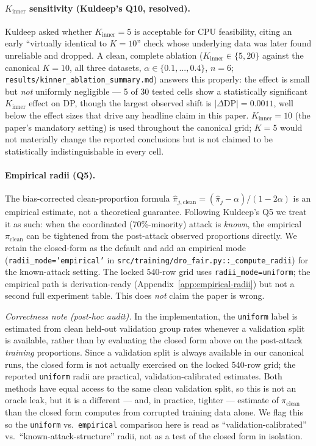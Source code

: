\paragraph{$K_{\mathrm{inner}}$ sensitivity (Kuldeep's Q10, resolved).}
Kuldeep asked whether $K_{\mathrm{inner}}{=}5$ is acceptable for CPU
feasibility, citing an early ``virtually identical to $K{=}10$'' check
whose underlying data was later found unreliable and dropped. A clean,
complete ablation ($K_{\mathrm{inner}}\in\{5,20\}$ against the canonical
$K{=}10$, all three datasets, $\alpha\in\{0.1,...,0.4\}$, $n{=}6$;
\texttt{results/kinner\_ablation\_summary.md}) answers this properly:
the effect is small but \emph{not} uniformly negligible --- 5 of 30
tested cells show a statistically significant $K_{\mathrm{inner}}$
effect on DP, though the largest observed shift is
$|\Delta\mathrm{DP}|{=}0.0011$, well below the effect sizes that drive
any headline claim in this paper. $K_{\mathrm{inner}}{=}10$ (the paper's
mandatory setting) is used throughout the canonical grid; $K{=}5$ would
not materially change the reported conclusions but is not claimed to be
statistically indistinguishable in every cell.

\paragraph{Empirical radii (Q5).}
The bias-corrected clean-proportion formula
$\hat\pi_{j,\mathrm{clean}}=(\hat\pi_j-\alpha)/(1-2\alpha)$ is an
empirical estimate, not a theoretical guarantee.  Following Kuldeep's
Q5 we treat it as such: when the coordinated (70\%-minority) attack
is \emph{known}, the empirical $\pi_{\mathrm{clean}}$ can be tightened
from the post-attack observed proportions directly.  We retain the
closed-form as the default and add an empirical mode
(\texttt{radii\_mode='empirical'} in
\texttt{src/training/dro\_fair.py::\_compute\_radii}) for the
known-attack setting.  The locked 540-row grid uses
\texttt{radii\_mode=uniform}; the empirical path is derivation-ready
(Appendix~\ref{app:empirical-radii}) but not a second full experiment
table.  This does \emph{not} claim the paper is wrong.

\emph{Correctness note (post-hoc audit).} In the implementation, the
\texttt{uniform} label is estimated from clean held-out validation group
rates whenever a validation split is available, rather than by evaluating
the closed form above on the post-attack \emph{training} proportions.
Since a validation split is always available in our canonical runs, the
closed form is not actually exercised on the locked 540-row grid; the
reported \texttt{uniform} radii are practical, validation-calibrated
estimates. Both methods have equal access to the same clean validation
split, so this is not an oracle leak, but it is a different --- and, in
practice, tighter --- estimate of $\pi_{\mathrm{clean}}$ than the closed
form computes from corrupted training data alone. We flag this so the
\texttt{uniform} vs.\ \texttt{empirical} comparison here is read as
``validation-calibrated'' vs.\ ``known-attack-structure'' radii, not as a
test of the closed form in isolation.

